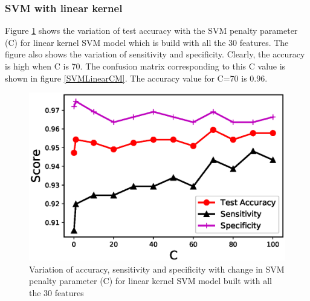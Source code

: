 \documentclass[twoside]{iitbreport}
\begin{document}
\subsubsection{SVM with linear kernel}
Figure \ref{SVMLinear} shows the variation of test accuracy with the SVM penalty parameter (C) for linear kernel SVM model which is build with all the 30 features. The figure also shows the variation of sensitivity and specificity. Clearly, the accuracy is high when C is 70. The confusion matrix corresponding to this C value is shown in figure \ref{SVMLinearCM}. The accuracy value for C=70 is 0.96.
\begin{figure}[]
  \begin{center}
    \includegraphics[trim={0cm 0cm 0cm 0cm},clip,scale=1]{Figures/SVM_Linear_Accuracy}
  \end{center}
  \caption{Variation of accuracy, sensitivity and specificity with change in SVM penalty parameter (C) for linear kernel SVM model built with all the 30 features}
  \label{SVMLinear}
\end{figure}
\end{document}
